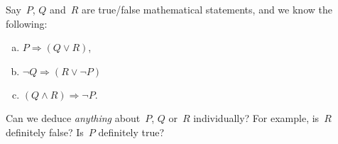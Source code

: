 Say~$P$, $Q$ and~$R$ are true/false mathematical statements, and we know the following:
\begin{enumerate}[(a)]
\item $P\Rightarrow(Q\vee R)$,
\item $\neg Q\Rightarrow (R\vee\neg P)$
\item $(Q\wedge R)\Rightarrow \neg P$.
\end{enumerate}
Can we deduce \emph{anything} about~$P$, $Q$ or~$R$ individually? For example, is~$R$ definitely false? Is~$P$ definitely true?

